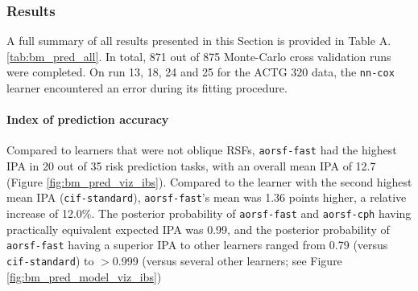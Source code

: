 \documentclass{article}\usepackage[]{graphicx}\usepackage[]{xcolor}
\newcommand{\tabrefAppendix}[1]{Table A.\ref{#1}}
\begin{document}
\subsubsection{Results} \label{sec:results_pred}

A full summary of all results presented in this Section is provided in \tabrefAppendix{tab:bm_pred_all}. In total, 871 out of 875 Monte-Carlo cross validation runs were completed. On run 13, 18, 24 and 25 for the ACTG 320 data, the \texttt{nn-cox} learner encountered an error during its fitting procedure.

\paragraph{Index of prediction accuracy}

Compared to learners that were not oblique RSFs, \texttt{aorsf-fast} had the highest IPA in 20 out of 35 risk prediction tasks, with an overall mean IPA of 12.7 (Figure \ref{fig:bm_pred_viz_ibs}). Compared to the learner with the second highest mean IPA (\texttt{cif-standard}), \texttt{aorsf-fast}'s mean was 1.36 points higher, a relative increase of 12.0\%. The posterior probability of \texttt{aorsf-fast} and \texttt{aorsf-cph} having practically equivalent expected IPA was 0.99, and the posterior probability of \texttt{aorsf-fast} having a superior IPA to other learners ranged from 0.79 (versus \texttt{cif-standard}) to $>$0.999 (versus several other learners; see Figure \ref{fig:bm_pred_model_viz_ibs})
\end{document}
